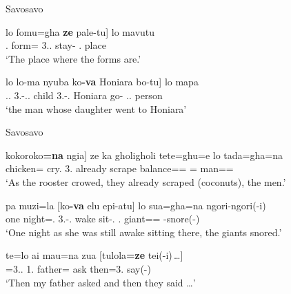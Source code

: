 \begin{exe}\ex\label{SavRel} {Savosavo} \citep[Solomons East Papuan; Solomon Islands; ][257, 258]{Wegener:2008}\nopagebreak[4]
\begin{xlist}
\ex\gll  {\rm[}lo fomu=gha \textbf{ze} pale-tu{\rm]} lo mavutu\\ 
\deter{}.\pl{} form=\pl{} 3.\pl{}.\gen{} stay-\relativ{} \deter{}.\sg{} place \\
`The place where the forms are.'%

\ex\gll  {\rm[}lo lo-ma nyuba ko\textbf{-va} Honiara bo-tu{\rm]} lo mapa\\
\deter{}.\sg{}.\mas{} 3\sg{}.\mas{}-\gen{}.\sg{}.\fem{} child 3\sg{}.\fem{}-\gen{}.\mas{} Honiara go-\relativ{} \deter{}.\sg{}.\mas{} person\\
`the man whose daughter went to Honiara' %
\end{xlist}
\end{exe}

\pagebreak
\begin{exe}\ex\label{SavAdv} {Savosavo} \citep[275, 272]{Wegener:2008}\nopagebreak[4]
\begin{xlist}
\ex\gll  {\rm[}kokoroko\textbf{=na} ngia{\rm]} ze ka gholigholi tete=ghu=e lo tada=gha=na\\
chicken=\nom{} cry.\simult{} 3\pl{}.\gen{} already scrape balance=\nmlz{}=\emphat{} \deter{}=\pl{} man=\pl{}=\nom{}\\
`As the rooster crowed, they already scraped (coconuts), the men.' %

\ex\gll pa muzi=la  {\rm[}ko\textbf{-va} elu epi-atu{\rm]} lo sua=gha=na ngori-ngori(-i)\\
one night=\loc{}.\mas{}  3\sg{}.\fem{}-\gen{}.\mas{} wake sit-\bg{}.\ipfv{} \deter{}.\pl{} giant=\pl{}=\nom{} \rdp{}-snore(-\fin{})\\
`One night as she was still awake sitting there, the giants snored.' %

\ex\gll te=lo ai mau=na zua  {\rm[}tulola\textbf{=ze} tei(-i)\,\dots{\rm]}\\
\conj{}=3\sg{}.\mas{}.\nom{} 1\sg{}.\gen{} father=\nom{} ask then=3\pl{}.\nom{} say(-\fin{})\\
`Then my father asked and then they said \dots' %
\end{xlist}
\end{exe}


